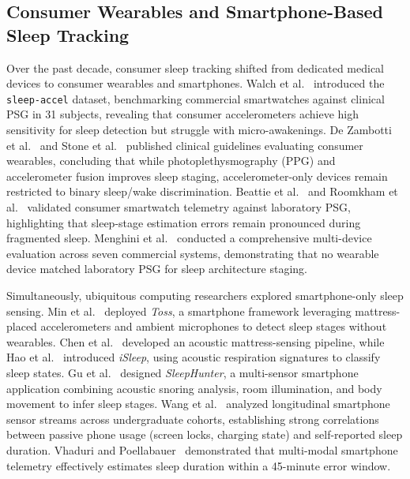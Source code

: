 \documentclass[journal,11pt,onecolumn]{IEEEtran}
\begin{document}
\subsection{Consumer Wearables and Smartphone-Based Sleep Tracking}
Over the past decade, consumer sleep tracking shifted from dedicated medical devices to consumer wearables and smartphones. Walch et al.~\cite{walch2019sleep} introduced the \texttt{sleep-accel} dataset, benchmarking commercial smartwatches against clinical PSG in 31 subjects, revealing that consumer accelerometers achieve high sensitivity for sleep detection but struggle with micro-awakenings. De Zambotti et al.~\cite{dezambotti2019wearable} and Stone et al.~\cite{stone2020evaluation} published clinical guidelines evaluating consumer wearables, concluding that while photoplethysmography (PPG) and accelerometer fusion improves sleep staging, accelerometer-only devices remain restricted to binary sleep/wake discrimination. Beattie et al.~\cite{beattie2017estimation} and Roomkham et al.~\cite{roomkham2018sleep} validated consumer smartwatch telemetry against laboratory PSG, highlighting that sleep-stage estimation errors remain pronounced during fragmented sleep. Menghini et al.~\cite{menghini2021performance} conducted a comprehensive multi-device evaluation across seven commercial systems, demonstrating that no wearable device matched laboratory PSG for sleep architecture staging.

Simultaneously, ubiquitous computing researchers explored smartphone-only sleep sensing. Min et al.~\cite{min2014toss} deployed \textit{Toss}, a smartphone framework leveraging mattress-placed accelerometers and ambient microphones to detect sleep stages without wearables. Chen et al.~\cite{chen2013unobtrusive} developed an acoustic mattress-sensing pipeline, while Hao et al.~\cite{hao2013isleep} introduced \textit{iSleep}, using acoustic respiration signatures to classify sleep states. Gu et al.~\cite{gu2014sleephunter} designed \textit{SleepHunter}, a multi-sensor smartphone application combining acoustic snoring analysis, room illumination, and body movement to infer sleep stages. Wang et al.~\cite{wang2014studentlife} analyzed longitudinal smartphone sensor streams across undergraduate cohorts, establishing strong correlations between passive phone usage (screen locks, charging state) and self-reported sleep duration. Vhaduri and Poellabauer~\cite{vhaduri2018estimating} demonstrated that multi-modal smartphone telemetry effectively estimates sleep duration within a 45-minute error window.
\end{document}
